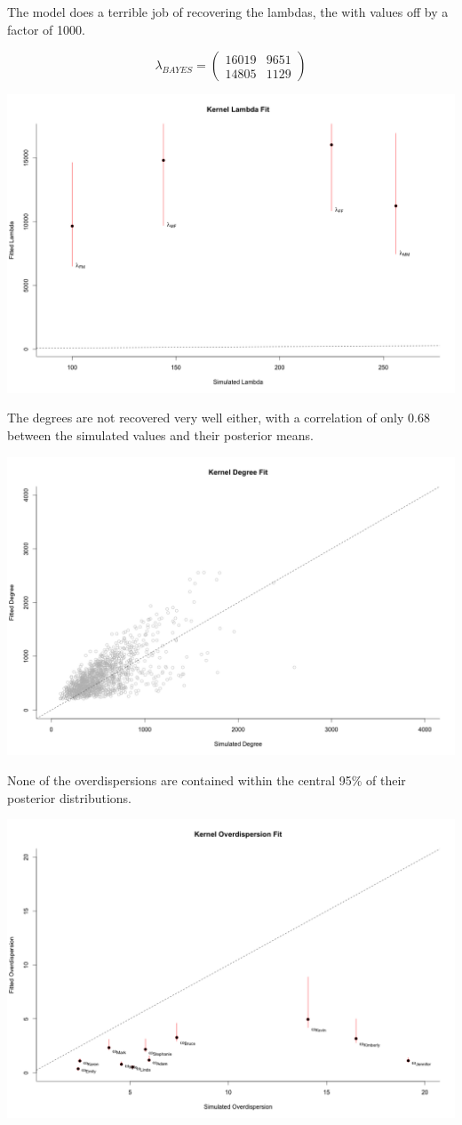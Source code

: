 \documentclass[12pt]{article}
\begin{document}
\noindent The model does a terrible job of recovering the lambdas, the with values off by a factor of 1000.

$$ \lambda_{BAYES}
= \left( \begin{array}{cc}
16019 & 9651 \\
14805 & 1129 \end{array} \right) $$

\includegraphics[scale = 0.39]{Lambda_Estimates.png}

\pagebreak
\noindent The degrees are not recovered very well either, with a correlation of only 0.68 between the simulated values and their posterior means.

\includegraphics[scale = 0.38]{Degree_Estimates.png}

\noindent None of the overdispersions are contained within the central 95\% of their posterior distributions.

\includegraphics[scale = 0.38]{Overdispersion_Estimates.png}
\end{document}

